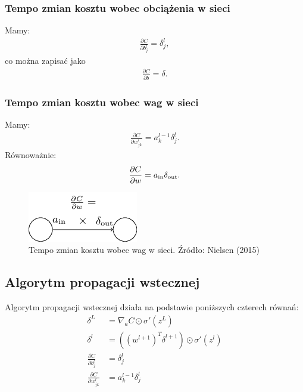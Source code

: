 \documentclass[10pt, oneside]{article}
\theoremstyle{remark}
\begin{document}
\subsubsection{Tempo zmian kosztu wobec obciążenia w sieci}
Mamy:
\begin{eqnarray}  
	\frac{\partial C}{\partial b^l_j} = \delta^l_j,
\end{eqnarray}
co można zapisać jako
\begin{eqnarray}
  \frac{\partial C}{\partial b} = \delta.
\end{eqnarray}

\subsubsection{Tempo zmian kosztu wobec wag w sieci}
Mamy:
\begin{eqnarray}
  \frac{\partial C}{\partial w^l_{jk}} = a^{l-1}_k \delta^l_j.
\end{eqnarray}
Równoważnie:
\begin{eqnarray}  
  \frac{\partial C}{\partial w} = a_{\rm in} \delta_{\rm out}.
\end{eqnarray}
\begin{figure}[!htpb]
	\centering
	\includegraphics[width=.2\linewidth]{figures/tikz20}
	\caption{Tempo zmian kosztu wobec wag w sieci. Źródło: Nielsen (2015)}
\end{figure}

\subsection{Algorytm propagacji wstecznej}
Algorytm propagacji wstecznej działa na podstawie poniższych czterech równań:
\begin{align}
	\delta^L &= \nabla_a C \odot \sigma'(z^L)\\
	\delta^l &= ((w^{l+1})^T \delta^{l+1}) \odot \sigma'(z^l)\\
	\frac{\partial C}{\partial b^l_j} &= \delta^l_j \\
	\frac{\partial C}{\partial w^l_{jk}} &= a^{l-1}_k \delta^l_j
\end{align}
\end{document}
